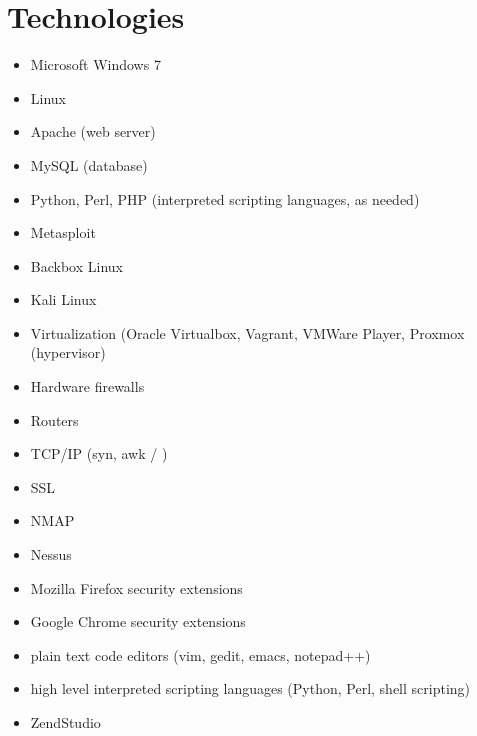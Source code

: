 \documentclass[letterpaper,10pt,english]{sphinxmanual}
\begin{document}
\section{Technologies}
\label{cybersecurity:technologies}\begin{itemize}
\item {} 
Microsoft Windows 7

\item {} 
Linux

\item {} 
Apache (web server)

\item {} 
MySQL (database)

\item {} 
Python, Perl, PHP (interpreted scripting languages, as needed)

\item {} 
Metasploit

\item {} 
Backbox Linux

\item {} 
Kali Linux

\item {} 
Virtualization (Oracle Virtualbox, Vagrant, VMWare Player, Proxmox (hypervisor)

\item {} 
Hardware firewalls

\item {} 
Routers

\item {} 
TCP/IP (syn, awk / )

\item {} 
SSL

\item {} 
NMAP

\item {} 
Nessus

\item {} 
Mozilla Firefox security extensions

\item {} 
Google Chrome security extensions

\item {} 
plain text code editors (vim, gedit, emacs, notepad++)

\item {} 
high level interpreted scripting languages (Python, Perl, shell scripting)

\item {} 
ZendStudio


\end{itemize}
\end{document}

